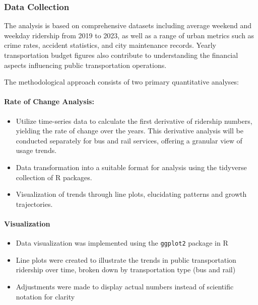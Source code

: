 \documentclass[
]{article}
\providecommand{\tightlist}{%
  \setlength{\itemsep}{0pt}\setlength{\parskip}{0pt}}
\begin{document}
\hypertarget{data-collection}{%
\subsubsection{Data Collection}\label{data-collection}}

The analysis is based on comprehensive datasets including average
weekend and weekday ridership from 2019 to 2023, as well as a range of
urban metrics such as crime rates, accident statistics, and city
maintenance records. Yearly transportation budget figures also
contribute to understanding the financial aspects influencing public
transportation operations.

The methodological approach consists of two primary quantitative
analyses:

\hypertarget{rate-of-change-analysis}{%
\paragraph{Rate of Change Analysis:}\label{rate-of-change-analysis}}

\begin{itemize}
\tightlist
\item
  Utilize time-series data to calculate the first derivative of
  ridership numbers, yielding the rate of change over the years. This
  derivative analysis will be conducted separately for bus and rail
  services, offering a granular view of usage trends.
\item
  Data transformation into a suitable format for analysis using the
  tidyverse collection of R packages.
\item
  Visualization of trends through line plots, elucidating patterns and
  growth trajectories.
\end{itemize}

\hypertarget{visualization}{%
\paragraph{Visualization}\label{visualization}}

\begin{itemize}
\tightlist
\item
  Data visualization was implemented using the \texttt{ggplot2} package
  in R
\item
  Line plots were created to illustrate the trends in public
  transportation ridership over time, broken down by transportation type
  (bus and rail)
\item
  Adjustments were made to display actual numbers instead of scientific
  notation for clarity
\end{itemize}
\end{document}
